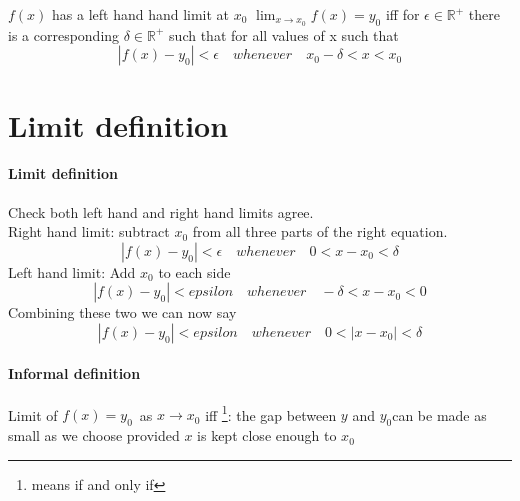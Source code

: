 \documentclass[12pt, a4paper,oneside]{book}
\begin{document}
\(f(x)\) has a left hand hand limit at \(x_0\)  \( \lim_{x \to x_0}f(x) = y_0 \) iff for \( \epsilon \in \mathbb{R^+} \) there is a corresponding \( \delta \in \mathbb{R^+} \) such that for all values of x  such that \[|f(x) - y_0| <\epsilon \quad whenever \quad x_0 -\delta < x < x_0\]


\section{Limit definition}
\paragraph{Limit definition}
\begin{paragraph}
Check both left hand and  right hand limits agree. \\
Right hand limit: subtract \(x_0\) from all three parts of the right equation.\[|f(x)-y_0|<\epsilon \quad whenever \quad 0<x-x_0<\delta\]
Left hand limit: Add \(x_0\) to each side \[|f(x)-y_0|<epsilon \quad whenever \quad -\delta < x-x_0<0\]
Combining these two we can now say
\[|f(x)-y_0|<epsilon \quad whenever \quad 0 < |x-x_0|<\delta\]
\end{paragraph}
\paragraph{Informal definition} \begin{paragraph} Limit of $f(x)=y_0 $ as ${x \to x_0}$ iff \footnote{means if and only if}: the gap between $y$ and $y_0$can be made as small as we choose provided $x$ is kept close enough to $x_0$\end{paragraph}
\end{document}
